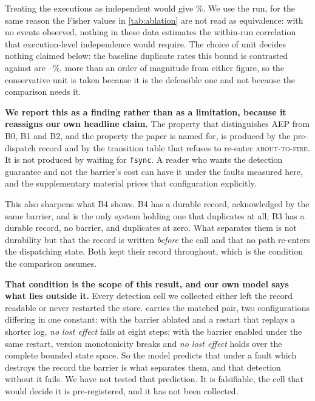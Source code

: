 Treating the executions as independent would give
\AblationZeroUpperExec{}\%. We use the run, for the same reason the Fisher
values in \cref{tab:ablation} are not read as equivalence: with no events
observed, nothing in these data estimates the within-run correlation that
execution-level independence would require. The choice of unit decides nothing
claimed below:
the baseline duplicate rates this bound is contrasted against are
\BaselineDupLowPct{}--\BaselineDupHighPct{}\%, more than an order of magnitude
from either figure, so the conservative unit is taken because it is the
defensible one and not because the comparison needs it.

\textbf{We report this as a finding rather than as a limitation, because it
reassigns our own headline claim.} The property that distinguishes AEP from
B0, B1 and B2, and the property the paper is named for, is produced by
the pre-dispatch record and by the transition table that refuses to
re-enter \textsc{about-to-fire}. It is not produced by waiting for
\texttt{fsync}. A reader who wants the detection guarantee and not the
barrier's cost can have it under the faults measured here, and the
supplementary material prices that configuration explicitly.

This also sharpens what B4 shows. B4 has a durable record, acknowledged by the
same barrier, and is the only system holding one that duplicates at all; B3 has
a durable record, no barrier, and duplicates at zero. What separates them is not
durability but that the record is written \emph{before} the call and that no
path re-enters the dispatching state. Both kept their record throughout, which
is the condition the comparison assumes.

\textbf{That condition is the scope of this result, and our own model says what
lies outside it.} Every detection cell we collected either left the record
readable or never restarted the store.  carries the
matched pair, two configurations differing in one constant: with the barrier
ablated and a restart that replays a shorter
log, \emph{no lost effect} fails at eight steps; with the barrier enabled under
the same restart, version monotonicity breaks and \emph{no lost effect} holds
over the complete bounded state space. So
the model predicts that under a fault which destroys the record the barrier is
what separates them, and that detection without it fails. We have not tested
that prediction. It is falsifiable, the cell that would decide it is
pre-registered, and it has not been collected.

